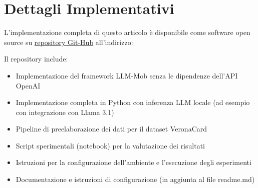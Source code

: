 \section{Dettagli Implementativi}

L'implementazione completa di questo articolo è disponibile come software open source su \href{https://github.com/simo-hue/LLM-Mob-As-Mobility-Interpreter.git}{repository Git-Hub} all'indirizzo:

Il repository include:
\begin{itemize}
\item Implementazione del framework LLM-Mob senza le dipendenze dell'API OpenAI
\item Implementazione completa in Python con inferenza LLM locale (ad esempio con integrazione con Llama 3.1)
\item Pipeline di preelaborazione dei dati per il dataset VeronaCard
\item Script sperimentali (notebook) per la valutazione dei risultati
\item Istruzioni per la configurazione dell'ambiente e l'esecuzione degli esperimenti
\item Documentazione e istruzioni di configurazione (in aggiunta al file readme.md)
\end{itemize}
